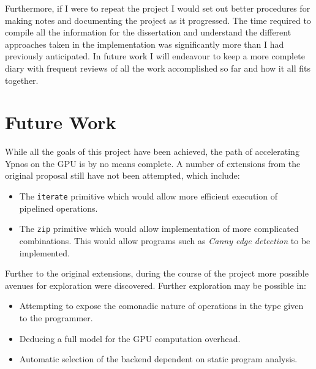\documentclass[12pt,a4paper,oneside]{scrbook}
\begin{document}
Furthermore, if I were to repeat the project I would set out better procedures
for making notes and documenting the project as it progressed. The time required
to compile all the information for the dissertation and understand the different
approaches taken in the implementation was significantly more than I had
previously anticipated. In future work I will endeavour to keep a more complete
diary with frequent reviews of all the work accomplished so far and how it all
fits together.

\section{Future Work}

While all the goals of this project have been achieved, the path of accelerating
Ypnos on the GPU is by no means complete. A number of extensions from the
original proposal still have not been attempted, which include:

\begin{itemize}
\item
  The \texttt{iterate} primitive which would allow more efficient execution of
  pipelined operations.
\item
  The \texttt{zip} primitive which would allow implementation of more
  complicated combinations. This would allow programs such as \emph{Canny edge
    detection} to be implemented.
\end{itemize}

Further to the original extensions, during the course of the project more
possible avenues for exploration were discovered. Further exploration may be
possible in:

\begin{itemize}
\item
  Attempting to expose the comonadic nature of operations in the type given to
  the programmer.
\item
  Deducing a full model for the GPU computation overhead.
\item
  Automatic selection of the backend dependent on static program analysis.
\end{itemize}

\printbibliography[heading=bibintoc]

\appendix


\end{document}
